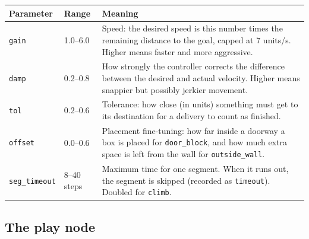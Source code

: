 \documentclass[11pt]{article}
\begin{document}
\begin{tabularx}{\linewidth}{@{}l l Y@{}}
  \toprule
  Parameter & Range & Meaning \\
  \midrule
  \texttt{gain}        & 1.0--6.0 & Speed: the desired speed is this number times the remaining distance
                                    to the goal, capped at 7 units/s. Higher means faster and more aggressive. \\
  \texttt{damp}        & 0.2--0.8 & How strongly the controller corrects the difference between the
                                    desired and actual velocity. Higher means snappier but possibly jerkier movement. \\
  \texttt{tol}         & 0.2--0.6 & Tolerance: how close (in units) something must get to its destination
                                    for a delivery to count as finished. \\
  \texttt{offset}      & 0.0--0.6 & Placement fine-tuning: how far inside a doorway a box is placed for
                                    \texttt{door\_block}, and how much extra space is left from the wall for
                                    \texttt{outside\_wall}. \\
  \texttt{seg\_timeout} & 8--40 steps & Maximum time for one segment. When it runs out, the segment is
                                    skipped (recorded as \texttt{timeout}). Doubled for \texttt{climb}. \\
  \bottomrule
\end{tabularx}

\subsection{The play node}
\label{sec:play}
\end{document}
